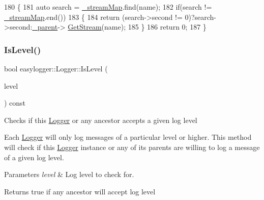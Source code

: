 \begin{DoxyCode}
180         \{
181             \textcolor{keyword}{auto} search = \mbox{\hyperlink{classeasylogger_1_1_logger_a9290bed24c12786abef2c421158268f8}{\_streamMap}}.find(name);
182             \textcolor{keywordflow}{if}(search != \mbox{\hyperlink{classeasylogger_1_1_logger_a9290bed24c12786abef2c421158268f8}{\_streamMap}}.end())
183             \{
184                 \textcolor{keywordflow}{return} (search->second != 0)?search->second:\mbox{\hyperlink{classeasylogger_1_1_logger_a83412985aecf3bc456c78a0b1425af85}{\_parent}}->
      \mbox{\hyperlink{classeasylogger_1_1_logger_ac4a1ce9232d6c0c7ec7668957d4a35ba}{GetStream}}(name);
185             \}
186             \textcolor{keywordflow}{return} 0;
187         \}
\end{DoxyCode}
\mbox{\label{classeasylogger_1_1_logger_a51a95dca60052b6d2f16bb0f0da7fe45}} 
\subsubsection{\texorpdfstring{Is\+Level()}{IsLevel()}}
{\footnotesize\ttfamily bool easylogger\+::\+Logger\+::\+Is\+Level (\begin{DoxyParamCaption}\item[{\mbox{\hyperlink{namespaceeasylogger_a68cb882ead21af982c40e3621fcd50b0}{Log\+Level}}}]{level }\end{DoxyParamCaption}) const\hspace{0.3cm}{\ttfamily [inline]}}

Checks if this \mbox{\hyperlink{classeasylogger_1_1_logger}{Logger}} or any ancestor accepts a given log level

Each \mbox{\hyperlink{classeasylogger_1_1_logger}{Logger}} will only log messages of a particular level or higher. This method will check if this \mbox{\hyperlink{classeasylogger_1_1_logger}{Logger}} instance or any of its parents are willing to log a message of a given log level.


\begin{DoxyParams}{Parameters}
{\em level} & Log level to check for. \\
\hline
\end{DoxyParams}
\begin{DoxyReturn}{Returns}
true if any ancestor will accept log level 
\end{DoxyReturn}


